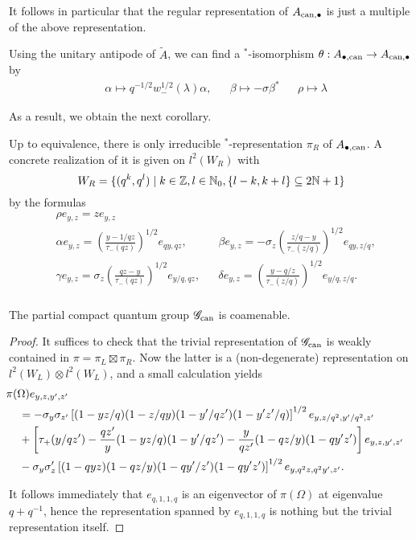 It follows in particular that the regular representation of $A_{\operatorname{\mathrm{can}},\bullet}$ is just a multiple of the above representation.

Using the unitary antipode of $\widetilde{A}$, we can find a $^*$-isomorphism $\theta:A_{\bullet,\operatorname{\mathrm{can}}}\rightarrow A_{\operatorname{\mathrm{can}},\bullet}$ by \begin{align*} &\alpha \mapsto q^{-1/2}w_-^{1/2}(\lambda)\alpha,&&\beta \mapsto -\sigma \beta^* &&\rho\mapsto \lambda\end{align*} 

As a result, we obtain the next corollary. 

\begin{Cor} Up to equivalence, there is only irreducible $^*$-representation $\pi_R$ of $A_{\bullet,\operatorname{\mathrm{can}}}$. A concrete realization of it is given on $l^2(W_R)$ with \[W_R= \{(q^k,q^l)\mid k\in \mathbb{Z},l\in \mathbb{N}_0, \{l-k,k+l\}\subseteq 2\mathbb{N}+1\}\] by the formulas \begin{align*} & \rho e_{y,z} =z e_{y,z} \\ &\alpha e_{y,z}  = \left(\frac{y-1/qz}{\tau_-(qz)}\right)^{1/2} e_{qy,qz},&& \beta e_{y,z}= -\sigma_z \left(\frac{z/q-y}{\tau_-(z/q)}\right)^{1/2} e_{qy,z/q},\\ &\gamma e_{y,z} = \sigma_z \left(\frac{qz-y}{\tau_-(qz)}\right)^{1/2}e_{y/q,qz},  &&\delta e_{y,z} = \left(\frac{y-q/z}{\tau_-(z/q)}\right)^{1/2} e_{y/q,z/q}.\\ 
\end{align*}
\end{Cor}

\begin{Theorem} The partial compact quantum group $\mathscr{G}_{\operatorname{\mathrm{can}}}$ is coamenable.
\end{Theorem}
\begin{proof} It suffices to check that the trivial representation of $\mathscr{G}_{\operatorname{\mathrm{can}}}$ is weakly contained in $\pi = \pi_L\boxtimes \pi_R$. Now the latter is a (non-degenerate) representation on $l^2(W_L)\otimes l^2(W_L)$, and a small calculation yields \begin{align*} &\hspace{-0.4cm}\pi(\Omega)e_{y,z,y',z'} \\ &= -\sigma_y\sigma_{z'} \left[(1-yz/q)(1-z/qy)(1-y'/qz')(1-y'z'/q)\right]^{1/2} e_{y,z/q^2,y'/q^2,z'} \\ &+ \left[\tau_+(y/qz') -\frac{qz'}{y}(1-yz/q)(1-y'/qz') -\frac{y}{qz'}(1-qz/y)(1-qy'z')\right] e_{y,z,y',z'} \\ & - \sigma_y\sigma_z'\left[(1-qyz)(1-qz/y)(1-qy'/z')(1-qy'z')\right]^{1/2} e_{y,q^2z,q^2y',z'}.\end{align*} 

It follows immediately that $e_{q,1,1,q}$ is an eigenvector of $\pi(\Omega)$ at eigenvalue $q+q^{-1}$, hence the representation spanned by $e_{q,1,1,q}$ is nothing but the trivial representation itself. 
\end{proof} 







